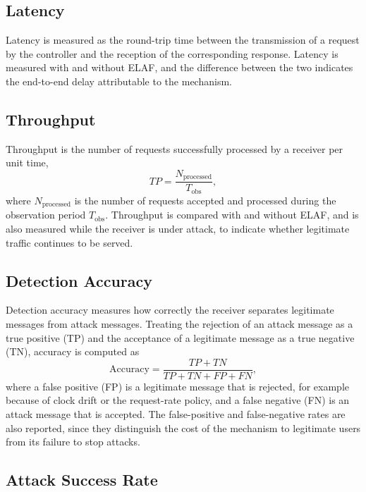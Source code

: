 \subsection{Latency}

Latency is measured as the round-trip time between the transmission of a request by the controller and the reception of the corresponding response. Latency is measured with and without ELAF, and the difference between the two indicates the end-to-end delay attributable to the mechanism.

\subsection{Throughput}

Throughput is the number of requests successfully processed by a receiver per unit time,
\begin{equation}
  TP = \frac{N_{\mathrm{processed}}}{T_{\mathrm{obs}}} ,
  \label{eq:tp}
\end{equation}
where $N_{\mathrm{processed}}$ is the number of requests accepted and processed during the observation period $T_{\mathrm{obs}}$. Throughput is compared with and without ELAF, and is also measured while the receiver is under attack, to indicate whether legitimate traffic continues to be served.

\subsection{Detection Accuracy}

Detection accuracy measures how correctly the receiver separates legitimate messages from attack messages. Treating the rejection of an attack message as a true positive (TP) and the acceptance of a legitimate message as a true negative (TN), accuracy is computed as
\begin{equation}
  \mathrm{Accuracy} = \frac{TP + TN}{TP + TN + FP + FN} ,
  \label{eq:acc}
\end{equation}
where a false positive (FP) is a legitimate message that is rejected, for example because of clock drift or the request-rate policy, and a false negative (FN) is an attack message that is accepted. The false-positive and false-negative rates are also reported, since they distinguish the cost of the mechanism to legitimate users from its failure to stop attacks.

\subsection{Attack Success Rate}

